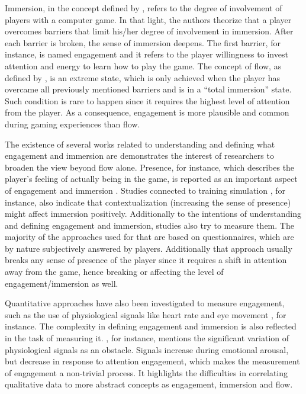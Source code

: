 Immersion, in the concept defined by \textcite{brown2004grounded}, refers to the degree of involvement of players with a computer game. In that light, the authors theorize that a player overcomes barriers that limit his/her degree of involvement in immersion. After each barrier is broken, the sense of immersion deepens. The first barrier, for instance, is named engagement and it refers to the player willingness to invest attention and energy to learn how to play the game. The concept of flow, as defined by \textcite{nakamura2014concept}, is an extreme state, which is only achieved when the player has overcame all previously mentioned barriers and is in a ``total immersion'' state. Such condition is rare to happen since it requires the highest level of attention from the player. As a consequence, engagement is more plausible and common during gaming experiences than flow.

The existence of several works \parencite{boyle2012engagement} related to understanding and defining what engagement and immersion are demonstrates the interest of researchers to broaden the view beyond flow alone. Presence, for instance, which describes the player's feeling of actually being in the game, is reported as an important aspect of engagement and immersion \parencite{weibel2011immersion}. Studies connected to training simulation \parencite{engstrom2016impact}, for instance, also indicate that contextualization (increasing the sense of presence) might affect immersion positively. Additionally to the intentions of understanding and defining engagement and immersion, studies also try to measure them. The majority of the approaches used for that are based on questionnaires, which are by nature subjectively answered by players. Additionally that approach usually breaks any sense of presence of the player since it requires a shift in attention away from the game, hence breaking or affecting the level of engagement/immersion as well.

Quantitative approaches have also been investigated to measure engagement, such as the use of physiological signals like heart rate \parencite{ravaja20051} and eye movement \parencite{jennett2008measuring}, for instance. The complexity in defining engagement and immersion is also reflected in the task of measuring it. \textcite{ravaja20051}, for instance, mentions the significant variation of physiological signals as an obstacle. Signals increase during emotional arousal, but decrease in response to attention engagement, which makes the measurement of engagement a non-trivial process. It highlights the difficulties in correlating qualitative data to more abstract concepts as engagement, immersion and flow.

